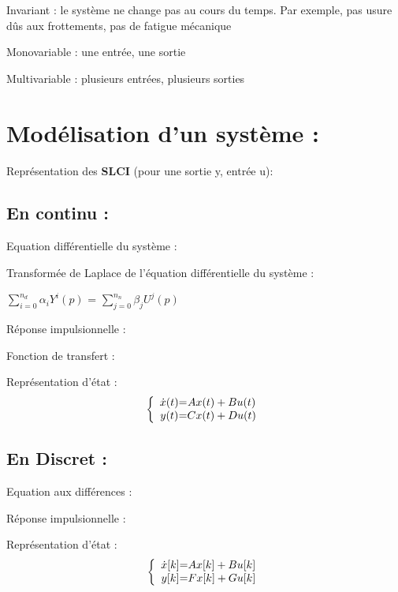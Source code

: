 Invariant : le système ne change pas au cours du temps. Par exemple, pas usure dûs aux frottements, pas de fatigue mécanique \newline

Monovariable : une entrée, une sortie \newline

Multivariable : plusieurs entrées, plusieurs sorties \newpage 

\section{Modélisation d'un système :}
\large{
Représentation des \textbf{SLCI} (pour une sortie y, entrée u):
}
\subsection{En continu : }

Equation différentielle du système :
\begin{center}
\Large{}
\end{center}
Transformée de Laplace de l'équation différentielle du système : 
\begin{center}
\Large{{$\sum_{i=0}^{n_d} \alpha_{i} Y^{i}(p)$} = {$\sum_{j=0}^{n_n} \beta_{j} U^{j}(p)$}}
\end{center}
Réponse impulsionnelle :
\begin{center}
\Large{}     
\end{center}
Fonction de transfert :
\begin{center}
    \Large{}
\end{center}
Représentation d'état : 
\[
\left \{
\begin{array}{c @{=} c}
    \dot x(t) & Ax(t) + Bu(t)\\
    y(t) & Cx(t) + Du(t)
\end{array}
\right.
\]
\subsection{En Discret :}
Equation aux différences :
\begin{center}
\Large{}
\end{center}
Réponse impulsionnelle :
\begin{center}
\Large{}   
\end{center}
Représentation d'état : 
\[
\left \{
\begin{array}{c @{=} c}
    \dot x[k] & Ax[k] + Bu[k]\\
    y[k] & Fx[k] + Gu[k]
\end{array}
\right.
\]
\newpage
